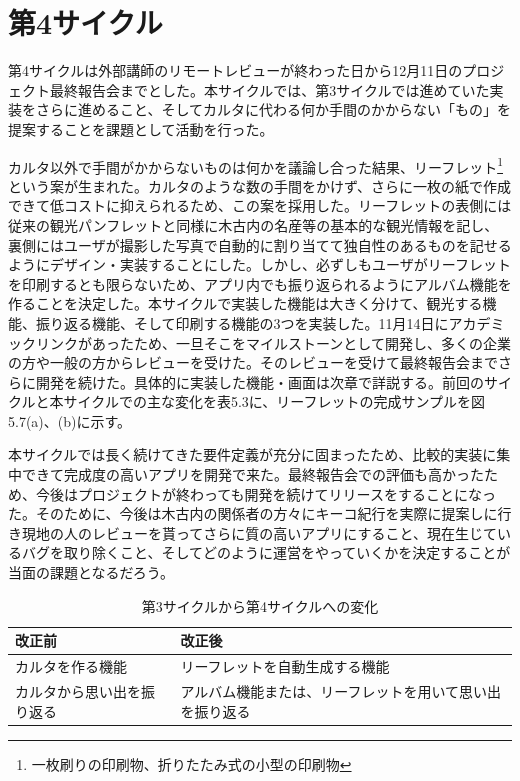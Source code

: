 \section{第4サイクル}
第4サイクルは外部講師のリモートレビューが終わった日から12月11日のプロジェクト最終報告会までとした。本サイクルでは、第3サイクルでは進めていた実装をさらに進めること、そしてカルタに代わる何か手間のかからない「もの」を提案することを課題として活動を行った。
\par カルタ以外で手間がかからないものは何かを議論し合った結果、リーフレット\footnote{一枚刷りの印刷物、折りたたみ式の小型の印刷物}という案が生まれた。カルタのような数の手間をかけず、さらに一枚の紙で作成できて低コストに抑えられるため、この案を採用した。リーフレットの表側には従来の観光パンフレットと同様に木古内の名産等の基本的な観光情報を記し、裏側にはユーザが撮影した写真で自動的に割り当てて独自性のあるものを記せるようにデザイン・実装することにした。しかし、必ずしもユーザがリーフレットを印刷するとも限らないため、アプリ内でも振り返られるようにアルバム機能を作ることを決定した。本サイクルで実装した機能は大きく分けて、観光する機能、振り返る機能、そして印刷する機能の3つを実装した。11月14日にアカデミックリンクがあったため、一旦そこをマイルストーンとして開発し、多くの企業の方や一般の方からレビューを受けた。そのレビューを受けて最終報告会までさらに開発を続けた。具体的に実装した機能・画面は次章で詳説する。前回のサイクルと本サイクルでの主な変化を表5.3に、リーフレットの完成サンプルを図5.7(a)、(b)に示す。
\par 本サイクルでは長く続けてきた要件定義が充分に固まったため、比較的実装に集中できて完成度の高いアプリを開発で来た。最終報告会での評価も高かったため、今後はプロジェクトが終わっても開発を続けてリリースをすることになった。そのために、今後は木古内の関係者の方々にキーコ紀行を実際に提案しに行き現地の人のレビューを貰ってさらに質の高いアプリにすること、現在生じているバグを取り除くこと、そしてどのように運営をやっていくかを決定することが当面の課題となるだろう。

\begin{table}[htb]
\centering
\addtocounter{table}{+0}
\caption{第3サイクルから第4サイクルへの変化}
  \begin{tabular}{|l|l|} \hline
    改正前&改正後  \\ \hline 
    カルタを作る機能 & \parbox{20zw}{リーフレットを自動生成する機能} \\  \hline
    カルタから思い出を振り返る &\parbox{20zw}{アルバム機能または、リーフレットを用いて思い出を振り返る}\\ \hline
  \end{tabular} 
\end{table}

